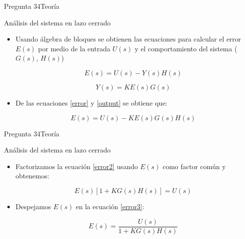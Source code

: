 \documentclass[10pt]{beamer}
\begin{document}
\begin{frame}{Pregunta 34}{Teoría}
\begin{block}{Análisis del sistema en lazo cerrado}
  \begin{itemize}
    \item<1-> Usando álgebra de bloques se obtienen las ecuaciones para calcular el error $E(s)$ por medio de la entrada $U(s)$ y el comportamiento del sistema ($G(s)$, $H(s)$)
    
    \begin{equation}\label{error}
        E(s) = U(s) - Y(s)H(s)
    \end{equation}
    
    \begin{equation}\label{output}
        Y(s) = K E(s) G(s)
    \end{equation}
    
    \vspace{}
    
    \item<2-> De las ecuaciones \ref{error} y \ref{output} se obtiene que:
    
    \begin{equation}\label{error2}
        E(s) = U(s) - KE(s)G(s)H(s)
    \end{equation}
    
  \end{itemize}
 

\end{block}
\end{frame}


\begin{frame}{Pregunta 34}{Teoría}
\begin{block}{Análisis del sistema en lazo cerrado}
  \begin{itemize}
    \item<1-> Factorizamos la ecuación \ref{error2} usando $E(s)$ como factor común y obtenemos:
    
    \begin{equation}\label{error3}
        E(s)[1+KG(s)H(s)] = U(s)
    \end{equation}
    
    \vspace{}
    
    \item<2-> Despejamos $E(s)$ en la ecuación \ref{error3}:
    
    \begin{equation}\label{error4}
        E(s) = \frac{U(s)}{1+KG(s)H(s)}
    \end{equation}
    
  \end{itemize}
 

\end{block}
\end{frame}
\end{document}
